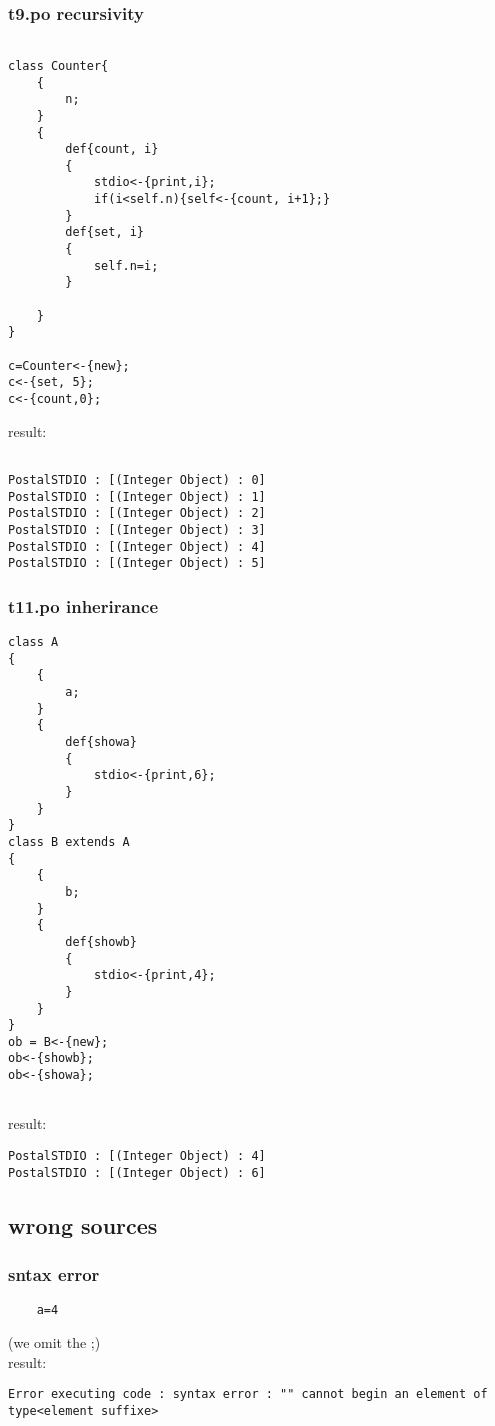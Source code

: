 \documentclass{eplDoc}
\begin{document}
\subsubsection{t9.po recursivity}
\begin{lstlisting}
    
class Counter{
    {
        n;
    }
    {
        def{count, i}
        {
            stdio<-{print,i};
            if(i<self.n){self<-{count, i+1};}
        }
        def{set, i}
        {
            self.n=i;
        }
            
    }
}

c=Counter<-{new};
c<-{set, 5};
c<-{count,0};
\end{lstlisting}
result:
\begin{lstlisting}
    
PostalSTDIO : [(Integer Object) : 0]
PostalSTDIO : [(Integer Object) : 1]
PostalSTDIO : [(Integer Object) : 2]
PostalSTDIO : [(Integer Object) : 3]
PostalSTDIO : [(Integer Object) : 4]
PostalSTDIO : [(Integer Object) : 5]
\end{lstlisting}

\subsubsection{t11.po inherirance}
\begin{lstlisting}
class A 
{
    {
        a;    
    }
    {
        def{showa}
        {
            stdio<-{print,6};
        }       
    }
}
class B extends A
{
    {
        b;
    }
    {
        def{showb}
        {
            stdio<-{print,4};
        }       
    }
}
ob = B<-{new};
ob<-{showb};
ob<-{showa};
    
\end{lstlisting}
result:
\begin{lstlisting}
PostalSTDIO : [(Integer Object) : 4]
PostalSTDIO : [(Integer Object) : 6]
\end{lstlisting}
\subsection{wrong sources}
\subsubsection{sntax error}
\begin{lstlisting}
    a=4
\end{lstlisting}
(we omit the ;)\\
result:
\begin{lstlisting}
Error executing code : syntax error : "" cannot begin an element of type<element suffixe>
\end{lstlisting}
\end{document}
